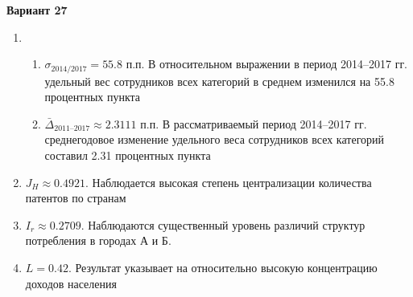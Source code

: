 \documentclass{article}
\begin{document}
\textbf{Вариант 27}
\begin{enumerate}
\item \begin{enumerate} \item $\sigma_\text{2014/2017}= 55.8$ п.п. В относительном выражении в период 2014--2017 гг. удельный вес сотрудников всех категорий в среднем изменился на 55.8 процентных пункта
\item $\bar\Delta_\text{2011--2017}\approx 2.3111$ п.п. В рассматриваемый период 2014--2017 гг. среднегодовое изменение удельного веса сотрудников всех категорий составил 2.31 процентных пункта\end{enumerate}
\item $J_H \approx 0.4921$. Наблюдается высокая степень централизации количества патентов по странам
\item $I_r\approx 0.2709$. Наблюдаются существенный уровень различий структур потребления в городах А и Б.
\item $L= 0.42$. Результат указывает на относительно высокую концентрацию доходов населения
\end{enumerate}
\end{document}
